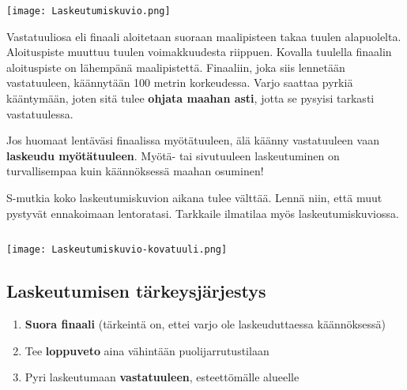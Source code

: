 \begin{multicols}{2}
\begin{Figure}\centering\texttt{[image: Laskeutumiskuvio.png]}\end{Figure} 


Vastatuuliosa eli finaali aloitetaan suoraan maalipisteen takaa tuulen alapuolelta. Aloituspiste muuttuu tuulen voimakkuudesta riippuen. Kovalla tuulella finaalin aloituspiste on lähempänä maalipistettä. Finaaliin, joka siis lennetään vastatuuleen, käännytään 100 metrin korkeudessa. Varjo saattaa pyrkiä kääntymään, joten sitä tulee \textbf{ohjata maahan asti}, jotta se pysyisi tarkasti vastatuulessa.  


Jos huomaat lentäväsi finaalissa myötätuuleen, älä käänny vastatuuleen vaan \textbf{laskeudu myötätuuleen}. Myötä- tai sivutuuleen laskeutuminen on turvallisempaa kuin käännöksessä maahan osuminen! 


S-mutkia koko laskeutumiskuvion aikana tulee välttää. Lennä niin, että muut pystyvät ennakoimaan lentoratasi. Tarkkaile ilmatilaa myös laskeutumiskuviossa. 

\begin{verbatim}        
\end{verbatim}

\begin{Figure}\centering\texttt{[image: Laskeutumiskuvio-kovatuuli.png]}\end{Figure} 

\subsection{Laskeutumisen tärkeysjärjestys}
\label{hyppytapahtuma-laskeutumisen-tarkeysjarjestys}

\begin{framed}
\begin{enumerate}[label=\bfseries \arabic*)]
\item  \textbf{Suora finaali} (tärkeintä on, ettei varjo ole laskeuduttaessa käännöksessä) 
\item  Tee \textbf{loppuveto} aina vähintään puolijarrutustilaan 
\item  Pyri laskeutumaan \textbf{vastatuuleen}, esteettömälle alueelle 
\end{enumerate}
\end{framed}


\end{multicols}
